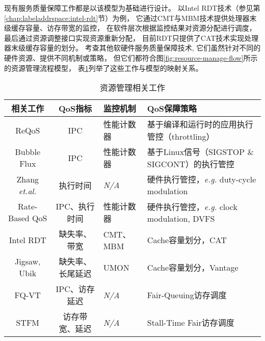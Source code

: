 
现有服务质量保障工作都是以该模型为基础进行设计。
以Intel RDT技术（参见第\ref{chap:labeladdrspace:intel-rdt}节）为例，
它通过CMT与MBM技术提供处理器末级缓存容量、访存带宽的监控，
在软件层次根据监控结果对资源分配进行调度，
最后通过资源调整接口实现资源重新分配，
目前RDT只提供了CAT技术实现处理器末级缓存容量的划分。
考查其他软硬件服务质量保障技术\cite{tang_reqos:_2013,yang_bubble-flux:_2013,Zhang:2009,herdrich_rate-based_2009,Jigsaw:2013,kasture_ubik:_2014,Nesbit:2006,mutlu_stall-time_2007},
它们虽然针对不同的硬件资源、提供不同机制或策略，
但它们都符合图\ref{fig:resource-manage-flow}所示的资源管理流程模型，
表\ref{tab:resman-compare}列举了这些工作与模型的映射关系。

\begin{table}[htb]
  \centering
  \begin{minipage}[t]{\linewidth}
  \caption{资源管理相关工作}
  \label{tab:resman-compare}
    \begin{tabular*}{\linewidth}{ccp{2cm}p{6cm}}
      \toprule[1.5pt]
      \textbf{相关工作}                        & \textbf{QoS指标} & \textbf{监控机制}   & \textbf{QoS保障策略}     \\
      \midrule[1pt]
      ReQoS\cite{tang_reqos:_2013}             & IPC              & 性能计数器 & 基于编译和运行时的应用执行管控（throttling）     \\
      Bubble Flux\cite{yang_bubble-flux:_2013} & IPC              & 性能计数器 & 基于Linux信号（SIGSTOP \& SIGCONT）的执行管控    \\
      \hline
      Zhang \emph{et.al.}\cite{Zhang:2009}     & 执行时间         & \emph{N/A} & 硬件执行管控，\emph{e.g.} duty-cycle modulation  \\
      Rate-Based QoS\cite{herdrich_rate-based_2009} & IPC、执行时间    & 性能计数器 & 硬件执行管控，\emph{e.g.} clock modulation, DVFS \\
      Intel RDT\cite{intel-rdt}                & 缺失率、带宽     & CMT、MBM                               & Cache容量划分，CAT                                 \\
      Jigsaw\cite{Jigsaw:2013}, Ubik\cite{kasture_ubik:_2014} & 缺失率、长尾延迟 & UMON\cite{qureshi_utility-based_2006}  & Cache容量划分，Vantage\cite{sanchez_vantage:_2011} \\
      FQ-VT\cite{Nesbit:2006}                  & IPC、访存延迟        & \emph{N/A}  & Fair-Queuing访存调度    \\
      STFM\cite{mutlu_stall-time_2007}         & 访存带宽、延迟       & \emph{N/A}  & Stall-Time Fair访存调度 \\
      \bottomrule[1.5pt]
    \end{tabular*}\\[2pt]
  \end{minipage}
\end{table}

